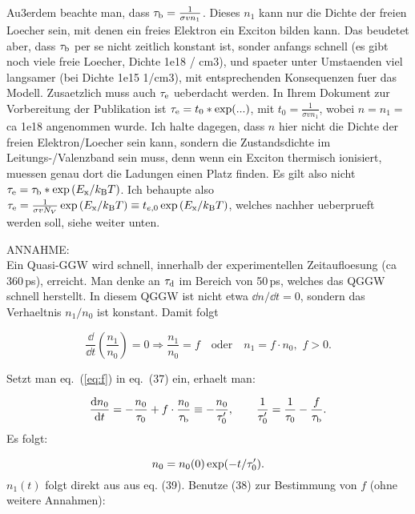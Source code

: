 \noindent
Au3erdem beachte man, dass $\tau_{\textrm{b}} = \frac{1}{\sigma v n_1}$. 
Dieses $n_1$ kann nur die Dichte der freien Loecher sein, mit denen ein freies Elektron ein Exciton bilden kann. 
Das beudetet aber, dass $\tau_{\textrm{b}}$ per se nicht zeitlich konstant ist, sonder anfangs schnell (es gibt noch viele freie Loecher, Dichte 1e18 / cm3), und spaeter unter Umstaenden viel langsamer (bei Dichte 1e15 1/cm3), 
 mit entsprechenden Konsequenzen fuer das Modell. 
Zusaetzlich muss auch $\tau_\textrm{e}$ ueberdacht werden. 
In Ihrem Dokument zur Vorbereitung der Publikation ist $\tau_\textrm{e} = t_0 *\exp(...)$, mit $t_0 = \frac{1}{\sigma v n_1}$, wobei $n = n_1 = $ ca 1e18 angenommen wurde. 
Ich halte dagegen, dass $n$ hier nicht die Dichte der freien Elektron/Loecher sein kann, sondern die Zustandsdichte im Leitungs-/Valenzband sein muss,
 denn wenn ein Exciton thermisch ionisiert, muessen genau dort die Ladungen einen Platz finden. 
Es gilt also nicht $\tau_\textrm{e} = \tau_{\textrm{b}}*\exp{\left( E_{\textrm{x}}/k_{\textrm{B}}T \right)}$. 
Ich behaupte also $\tau_\textrm{e} = \frac{1}{\sigma v N_V} \exp{\left( E_{\textrm{x}}/k_{\textrm{B}}T \right)} \equiv t_{e,0}\exp{\left( E_{\textrm{x}}/k_{\textrm{B}}T \right)}$, welches nachher ueberprueft werden soll, siehe weiter unten. 

ANNAHME:\\
Ein Quasi-GGW wird schnell, innerhalb der experimentellen Zeitaufloesung (ca 360\,ps), erreicht. 
Man denke an $\tau_{\textrm{d}}$ im Bereich von 50\,ps, welches das QGGW schnell herstellt. 
In diesem QGGW ist nicht etwa $\dd n / \dd t = 0$, sondern das Verhaeltnis $n_1/n_0$ ist konstant.
Damit folgt

\begin{equation}
 \frac{\dd}{\dd t} \left( \frac{n_1}{n_0}\right) = 0 \Rightarrow  \frac{n_1}{n_0} = f \quad \textrm{oder} \quad n_1 = f\cdot n_0,\,\,f>0.
 \label{eq:f}
\end{equation}

\noindent
Setzt man eq.~(\ref{eq:f}) in eq.~(37) ein, erhaelt man:

\begin{equation}
 \frac{\mathrm d n_0}{\mathrm d t} =  -\frac{n_0}{\tau_{0}} + f\cdot \frac{n_0}{\tau_{\textrm{b}}} \equiv -\frac{n_0}{\tau_{0}^{\prime}}, \qquad \frac{1}{\tau_{0}^{\prime}} = \frac{1}{\tau_{0}} - \frac{f}{\tau_{\textrm{b}}}.
\end{equation}
\noindent
Es folgt:

\begin{equation}
 n_0 = n_0 (0) \exp(-t / \tau_{0}^{\prime}).
 \label{eq:n0}
\end{equation}
\noindent
$n_1(t)$ folgt direkt aus aus eq. (39). 
Benutze (38) zur Bestimmung von $f$ (ohne weitere Annahmen):

